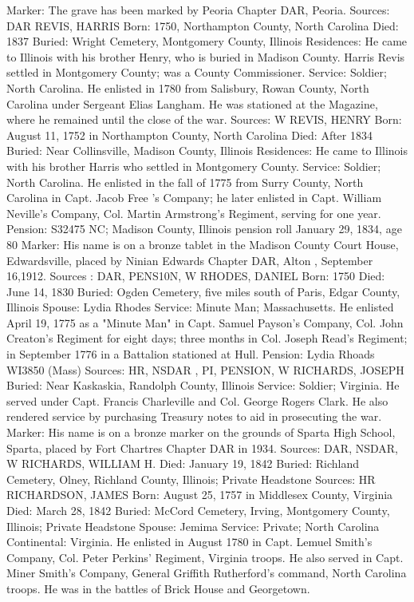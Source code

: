Marker: The grave has been marked by Peoria Chapter DAR, Peoria. 
Sources: DAR 
REVIS, HARRIS
Born: 1750, Northampton County, North Carolina
Died:  1837
Buried: Wright Cemetery, Montgomery County, Illinois
Residences: He came to Illinois with his brother Henry, who is buried in Madi­son County. Harris Revis settled in Montgomery County; was a County Commissioner. 
Service: Soldier; North Carolina. He enlisted in 1780 from Salisbury, Rowan County, North Carolina under Sergeant Elias Langham. He was stationed at the Magazine, where he remained until the close of the war. 
Sources: W 
REVIS, HENRY
Born: August 11, 1752 in Northampton County, North Carolina
Died:  After 1834
Buried: Near Collinsville, Madison County, Illinois
Residences: He came to Illinois with his brother Harris who settled in Montgomery County.
Service: Soldier; North Carolina. He enlisted in the fall of 1775 from Surry County, North Carolina in Capt. Jacob Free 's Company; he later enlisted in Capt. William Neville's Company, Col. Martin Armstrong's Regiment, serving for one year. 
Pension: S32475 NC; Madison County, Illinois pension roll January 29, 1834, age 80 
Marker: His name is on a bronze tablet in the Madison County Court House, Edwardsville, placed by Ninian Edwards Chapter DAR, Alton , September 16,1912. 
Sources : DAR, PENS10N, W 
RHODES, DANIEL 
Born: 1750
Died:  June 14, 1830
Buried: Ogden Cemetery, five miles south of Paris, Edgar County, Illinois
Spouse: Lydia Rhodes
Service: Minute Man; Massachusetts. He enlisted April 19, 1775 as a "Minute Man" in Capt. Samuel Payson's Company, Col. John Creaton's Regiment for eight days; three months in Col. Joseph Read's Regiment; in September 1776 in a Battalion stationed at Hull. 
Pension: Lydia Rhoads WI3850 (Mass) 
Sources: HR, NSDAR , PI, PENSION, W 
RICHARDS, JOSEPH 
Buried: Near Kaskaskia, Randolph County, Illinois 
Service: Soldier; Virginia. He served under Capt. Francis Charleville and Col. George Rogers Clark. He also rendered service by purchasing Treasury notes to aid in prosecuting the war. 
Marker: His name is on a bronze marker on the grounds of Sparta High School, Sparta, placed by Fort Chartres Chapter DAR in 1934. 
Sources: DAR, NSDAR, W 
RICHARDS, WILLIAM H. Died: January 19, 1842
Buried: Richland Cemetery, Olney, Richland County, Illinois; Private Headstone
Sources: HR 
RICHARDSON, JAMES 
Born: August 25, 1757 in Middlesex County, Virginia
Died:  March 28, 1842
Buried: McCord Cemetery, Irving, Montgomery County, Illinois; Private Head­stone
Spouse: Jemima
Service: Private; North Carolina Continental: Virginia. He enlisted in August 1780 in Capt. Lemuel Smith's Company, Col. Peter Perkins' Regiment, Virginia troops. He also served in Capt. Miner Smith's Company, General Grif­fith Rutherford's command, North Carolina troops. He was in the battles of Brick House and Georgetown. 
